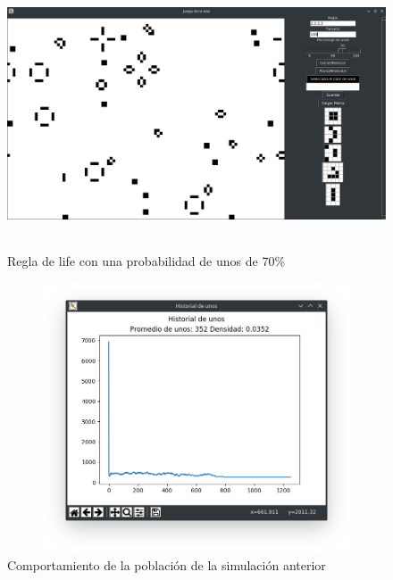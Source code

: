 \begin{figure}[H]
\begin{center}
 \includegraphics[width=12cm, height=8cm]{./img/life70.png}
 \caption{Regla de life con una probabilidad de unos de 70\%}
 \label{fig:life70}
\end{center}
\end{figure}

\begin{figure}[H]
\begin{center}
 \includegraphics[width=12cm, height=8cm]{./img/life70grafica.png}
 \caption{Comportamiento de la población de la simulación anterior}
 \label{fig:life70grafica}
\end{center}
\end{figure}

